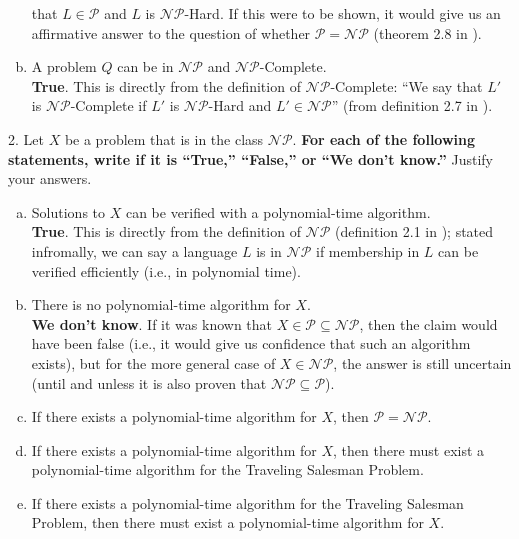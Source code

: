 \documentclass{scrartcl}
\begin{document}
\begin{flushleft}
\begin{enumerate}[(a)]
            that $L \in \mathcal{P}$ and $L$ is $\mathcal{NP}$-Hard. If this were to be shown, it
            would give us an affirmative answer to the question of whether $\mathcal{P} =
            \mathcal{NP}$ (theorem 2.8 in \cite{modernapp}).
        \item A problem $Q$ can be in $\mathcal{NP}$ and $\mathcal{NP}$-Complete.\\
            \bigskip
            \textbf{True}. This is directly from the definition of $\mathcal{NP}$-Complete: ``We say
            that $L'$ is $\mathcal{NP}$-Complete if $L'$ is $\mathcal{NP}$-Hard and $L' \in
            \mathcal{NP}$'' (from definition 2.7 in \cite{modernapp}).
    \end{enumerate}
    2. Let $X$ be a problem that is in the class $\mathcal{NP}$. \textbf{For each of the following
    statements, write if it is ``True,'' ``False,'' or ``We don't know.''} Justify your answers.\\
    \begin{enumerate}[(a)]
        \item Solutions to $X$ can be verified with a polynomial-time algorithm.\\
            \bigskip
            \textbf{True}. This is directly from the definition of $\mathcal{NP}$ (definition 2.1 in
            \cite{modernapp}); stated infromally, we can say a language $L$ is in $\mathcal{NP}$ if
            membership in $L$ can be verified efficiently (i.e., in polynomial time).
        \item There is no polynomial-time algorithm for $X$.\\
            \bigskip
            \textbf{We don't know}. If it was known that $X \in \mathcal{P} \subseteq \mathcal{NP}$,
            then the claim would have been false (i.e., it would give us confidence that such an
            algorithm exists), but for the more general case of $X \in \mathcal{NP}$, the answer is
            still uncertain (until and unless it is also proven that $\mathcal{NP} \subseteq
            \mathcal{P}$).
        \item If there exists a polynomial-time algorithm for $X$, then $\mathcal{P} =
            \mathcal{NP}$.
        \item If there exists a polynomial-time algorithm for $X$, then there must exist a
            polynomial-time algorithm for the Traveling Salesman Problem.
        \item If there exists a polynomial-time algorithm for the Traveling Salesman Problem, then
            there must exist a polynomial-time algorithm for $X$.
    \end{enumerate}

    
    
\end{flushleft}
\end{document}
